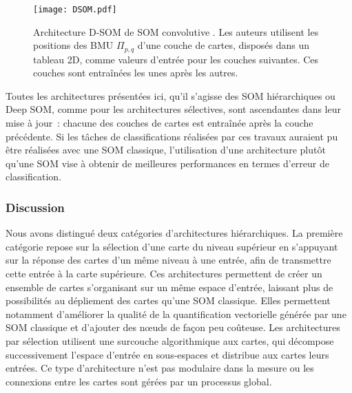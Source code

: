 \documentclass[../main]{subfiles}
\begin{document}
\begin{figure}[t]
    \texttt{[image: DSOM.pdf]}
    \caption{Architecture D-SOM de SOM \og convolutive \fg{} \parencite{liu_deep_2015}. Les auteurs utilisent les positions des BMU $\Pi_{p,q}$ d'une couche de cartes, disposés dans un tableau 2D, comme valeurs d'entrée pour les couches suivantes. Ces couches sont entraînées les unes après les autres. \label{fig:dsom}}
\end{figure}

Toutes les architectures présentées ici, qu'il s'agisse des SOM hiérarchiques ou Deep SOM, comme pour les architectures sélectives, sont ascendantes dans leur mise à jour~: chacune des couches de cartes est entraînée après la couche précédente.
Si les tâches de classifications réalisées par ces travaux auraient pu être réalisées avec une SOM classique, l'utilisation d'une architecture plutôt qu'une SOM vise à obtenir de meilleures performances en termes d'erreur de classification.

\subsubsection{Discussion}

Nous avons distingué deux catégories d'architectures hiérarchiques. La première catégorie repose sur la sélection d'une carte du niveau supérieur en s'appuyant sur la réponse des cartes d'un même niveau à une entrée, afin de transmettre cette entrée à la carte supérieure. 
Ces architectures permettent de créer un ensemble de cartes s'organisant sur un même espace d'entrée, laissant plus de possibilités au dépliement des cartes qu'une SOM classique. 
Elles permettent notamment d'améliorer la qualité de la quantification vectorielle générée par une SOM classique et d'ajouter des n\oe{}uds de façon peu coûteuse. Les architectures par sélection utilisent une surcouche algorithmique aux cartes, qui décompose successivement l'espace d'entrée en sous-espaces et distribue aux cartes leurs entrées. Ce type d'architecture n'est pas modulaire dans la mesure ou les connexions entre les cartes sont gérées par un processus global.
\end{document}
